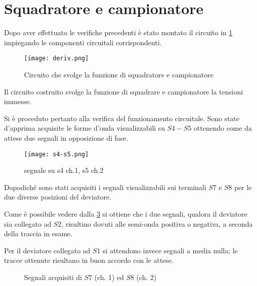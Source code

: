 \section{Squadratore e campionatore}
	Dopo aver effettuato le verifiche precedenti è stato montato il
	circuito in
	\figurename{ \ref{fig:sqd}}
	impiegando le componenti circuitali corrispondenti.

	\begin{figure}[ht]
		\centering
		\texttt{[image: deriv.png]}
		\caption{Circuito che svolge la funzione di squadratore e campionatore}
		\label{fig:sqd}
	\end{figure}

	Il circuito costruito svolge la funzione di squadrare e campionatore la tensioni immesse.

	Si è proceduto pertanto alla verifica del funzionamento circuitale.
	Sono state d'apprima acquisite le forme d'onda visualizzabili su $S4-S5$
	ottenendo come da attese due segnali in opposizione di fase.

	\begin{figure}[ht]
		\centering
		\texttt{[image: s4-s5.png]}
		\caption{segnale su s4 ch.1, s5 ch.2 }
		\label{f:s4-s5}
	\end{figure}

	Dopodiché sono stati acquisiti i segnali visualizzabili sui terminali $S7$ e $S8$
	per le due diverse posizioni del deviatore.

	Come è possibile vedere dalla \figurename{ \ref{fig:s7}} si ottiene che i due segnali, qualora il
	deviatore sia collegato ad $S2$,  risultino dovuti alle semi-onda
	positiva o negativa, a seconda della traccia in esame.

	Per il deviatore collegato ad $S1$
	si attendono invece segnali a media nulla; le tracce ottenute risultano in buon accordo
	con le attese.

	\begin{figure}[h]
		\centering
		\qquad
		\caption{Segnali acquisiti di $S7$ (ch. 1) ed $S8$ (ch. 2)}
		\label{fig:s7}
	\end{figure}
